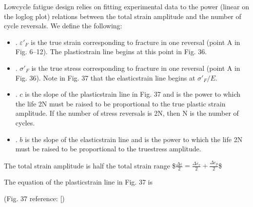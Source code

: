 \documentclass[letterpaper,10pt,english]{jupyterBook}
\begin{document}
	\sphinxAtStartPar
	Low\sphinxhyphen{}cycle fatigue design relies on fitting experimental data to the power (linear on the log\sphinxhyphen{}log plot) relations between the total strain amplitude and the number of cycle reversals. We define the following:
	\begin{itemize}
		\item {} 
		\sphinxAtStartPar
		. \({\varepsilon'_F}\) is the true strain corresponding to fracture in one reversal (point A in Fig. 6–12). The plastic\sphinxhyphen{}strain line begins at this point in Fig. 36.
		
		\item {} 
		\sphinxAtStartPar
		. \({\sigma'}_F\) is the true stress corresponding to fracture in one reversal (point A in Fig. 36). Note in Fig. 37 that the elastic\sphinxhyphen{}strain line begins at \({\sigma'}_F/E\).
		
		\item {} 
		\sphinxAtStartPar
		. \(c\) is the slope of the plastic\sphinxhyphen{}strain line in Fig. 37 and is the power to which the life 2N must be raised to be proportional to the true plastic strain amplitude. If the number of stress reversals is 2N, then N is the number of cycles.
		
		\item {} 
		\sphinxAtStartPar
		. \(b\) is the slope of the elastic\sphinxhyphen{}strain line and is the power to which the life 2N must be raised to be proportional to the true\sphinxhyphen{}stress amplitude.
		
	\end{itemize}
	
	\sphinxAtStartPar
	The total strain amplitude is half the total strain range
	\$\(\frac{\Delta \varepsilon}{2}=\frac{\Delta \varepsilon_e}{2}+\frac{\Delta \varepsilon_p}{2}\)\$
	
	\sphinxAtStartPar
	The equation of the plastic\sphinxhyphen{}strain line in Fig. 37 is
	
	
	
	\sphinxAtStartPar
	(Fig. 37 reference: {[}\sphinxhref{https://www.mheducation.com/highered/product/shigley-s-mechanical-engineering-design-budynas-nisbett/M9780073398211.html}{Shigley2020}{]})
	
\end{document}
